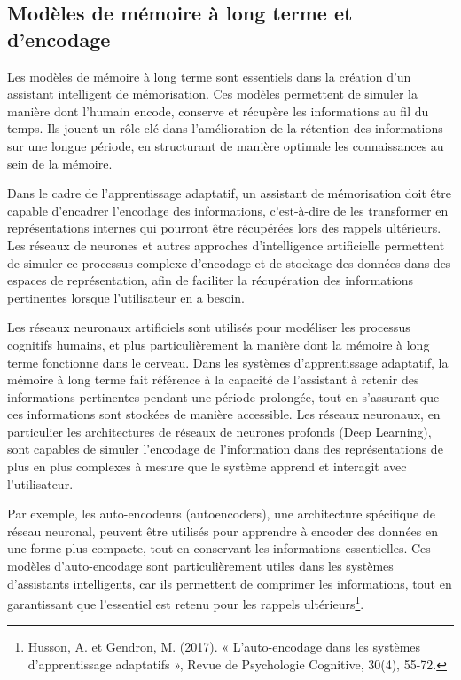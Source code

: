 \documentclass[11pt,a4paper]{report}
\begin{document}
\subsection{Modèles de mémoire à long terme et d'encodage}

Les modèles de mémoire à long terme sont essentiels dans la création d’un assistant intelligent de mémorisation. Ces modèles permettent de simuler la manière dont l'humain encode, conserve et récupère les informations au fil du temps. Ils jouent un rôle clé dans l'amélioration de la rétention des informations sur une longue période, en structurant de manière optimale les connaissances au sein de la mémoire.

Dans le cadre de l’apprentissage adaptatif, un assistant de mémorisation doit être capable d’encadrer l’encodage des informations, c'est-à-dire de les transformer en représentations internes qui pourront être récupérées lors des rappels ultérieurs. Les réseaux de neurones et autres approches d'intelligence artificielle permettent de simuler ce processus complexe d'encodage et de stockage des données dans des espaces de représentation, afin de faciliter la récupération des informations pertinentes lorsque l’utilisateur en a besoin.

Les réseaux neuronaux artificiels sont utilisés pour modéliser les processus cognitifs humains, et plus particulièrement la manière dont la mémoire à long terme fonctionne dans le cerveau. Dans les systèmes d’apprentissage adaptatif, la mémoire à long terme fait référence à la capacité de l’assistant à retenir des informations pertinentes pendant une période prolongée, tout en s’assurant que ces informations sont stockées de manière accessible. Les réseaux neuronaux, en particulier les architectures de réseaux de neurones profonds (Deep Learning), sont capables de simuler l’encodage de l’information dans des représentations de plus en plus complexes à mesure que le système apprend et interagit avec l’utilisateur.

Par exemple, les auto-encodeurs (autoencoders), une architecture spécifique de réseau neuronal, peuvent être utilisés pour apprendre à encoder des données en une forme plus compacte, tout en conservant les informations essentielles. Ces modèles d'auto-encodage sont particulièrement utiles dans les systèmes d’assistants intelligents, car ils permettent de comprimer les informations, tout en garantissant que l’essentiel est retenu pour les rappels ultérieurs\footnote{Husson, A. et Gendron, M. (2017). « L’auto-encodage dans les systèmes d’apprentissage adaptatifs », Revue de Psychologie Cognitive, 30(4), 55-72.}.
\end{document}

